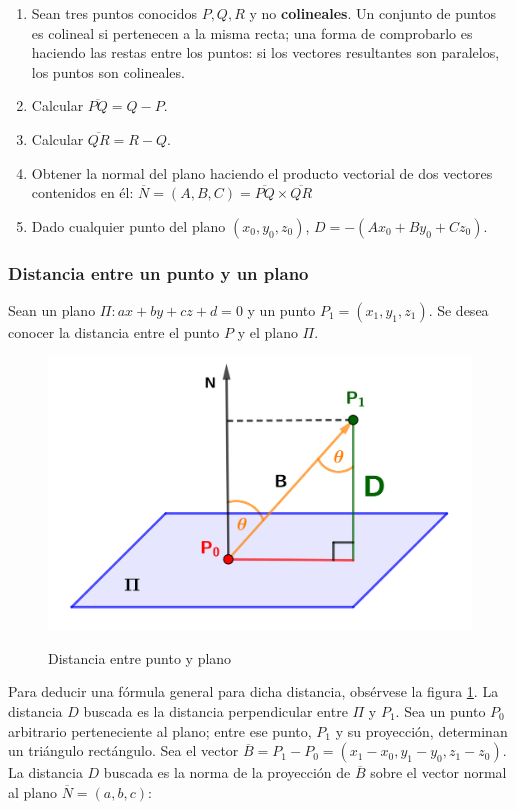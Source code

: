 \documentclass{article}
\begin{document}
\begin{enumerate}
\item Sean tres puntos conocidos $P, Q, R$ y no \textbf{colineales}. Un conjunto de puntos es colineal si pertenecen a la misma recta; una forma de comprobarlo es haciendo las restas entre los puntos: si los vectores resultantes son paralelos, los puntos son colineales.
\item Calcular $\overline{PQ} = Q - P$.
\item Calcular $\overline{QR} = R - Q$.
\item Obtener la normal del plano haciendo el producto vectorial de dos vectores contenidos en él: $\overline{N} = (A,B,C) = \overline{PQ} \times \overline{QR}$
\item Dado cualquier punto del plano $(x_0, y_0, z_0)$, $D = -(A x_0 + B y_0 + C z_0)$.
\end{enumerate}

\subsubsection{Distancia entre un punto y un plano}

Sean un plano $\Pi: ax + by + cz + d = 0$ y un punto $P_1 = (x_1, y_1, z_1)$. Se desea conocer la distancia entre el punto $P$ y el plano $\Pi$.

\begin{figure}[ht]
\caption{Distancia entre punto y plano}
\includegraphics[scale=0.8]{img/rn/distancia_punto_plano.png} 
\centering
\label{fig:distanciaplano}
\end{figure}

Para deducir una fórmula general para dicha distancia, obsérvese la figura \ref{fig:distanciaplano}. La distancia $D$ buscada es la distancia perpendicular entre $\Pi$ y $P_1$. Sea un punto $P_0$ arbitrario perteneciente al plano; entre ese punto, $P_1$ y su proyección, determinan un triángulo rectángulo. Sea el vector $\overline{B} = P_1 - P_0 = (x_1 - x_0, y_1 - y_0, z_1 - z_0)$. La distancia $D$ buscada es la norma de la proyección de $\overline{B}$ sobre el vector normal al plano $\overline{N} = (a, b, c)$:
\end{document}
